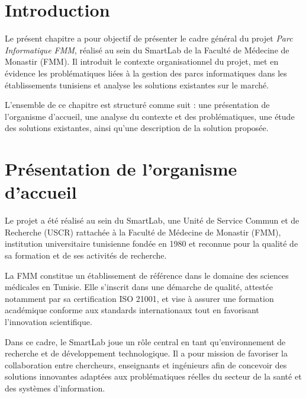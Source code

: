 ﻿
\vspace{1cm}
\setcounter{chapter}{1}
\label{chap:contexte_etude_existant}

\localtableofcontents
\newpage


\section*{Introduction}

Le présent chapitre a pour objectif de présenter le cadre général du projet \textit{Parc Informatique FMM}, réalisé au sein du SmartLab de la Faculté de Médecine de Monastir (FMM)\cite{FMM2020}. Il introduit le contexte organisationnel du projet, met en évidence les problématiques liées à la gestion des parcs informatiques dans les établissements tunisiens et analyse les solutions existantes sur le marché.

L’ensemble de ce chapitre est structuré comme suit : une présentation de l’organisme d’accueil, une analyse du contexte et des problématiques, une étude des solutions existantes, ainsi qu’une description de la solution proposée.

\section{Présentation de l’organisme d’accueil}

Le projet a été réalisé au sein du SmartLab, une Unité de Service Commun et de Recherche (USCR) rattachée à la Faculté de Médecine de Monastir (FMM), institution universitaire tunisienne fondée en 1980 et reconnue pour la qualité de sa formation et de ses activités de recherche.

La FMM constitue un établissement de référence dans le domaine des sciences médicales en Tunisie. Elle s’inscrit dans une démarche de qualité, attestée notamment par sa certification ISO 21001\cite{ISO21001}, et vise à assurer une formation académique conforme aux standards internationaux tout en favorisant l’innovation scientifique.

Dans ce cadre, le SmartLab joue un rôle central en tant qu’environnement de recherche et de développement technologique. Il a pour mission de favoriser la collaboration entre chercheurs, enseignants et ingénieurs afin de concevoir des solutions innovantes adaptées aux problématiques réelles du secteur de la santé et des systèmes d’information.

